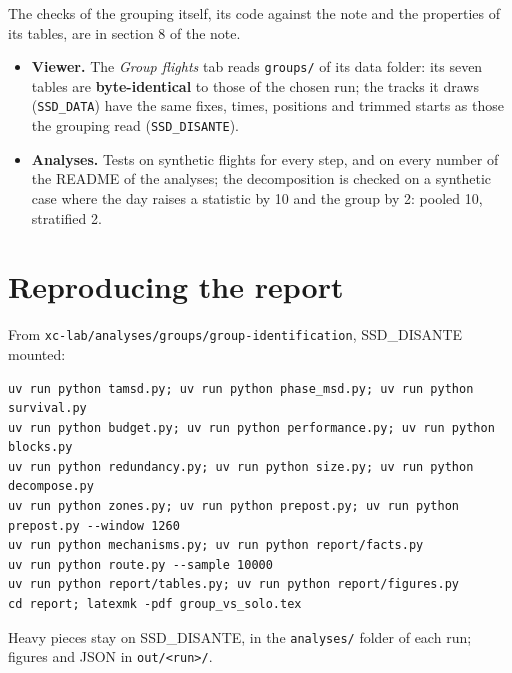 The checks of the grouping itself, its code against the note and the properties of its tables, are in
section 8 of the note.

\begin{itemize}
  \item \textbf{Viewer.} The \emph{Group flights} tab reads \texttt{groups/} of its data folder: its seven tables are \textbf{byte-identical} to those of the chosen run; the tracks it draws (\texttt{SSD\_DATA}) have the same fixes,
        times, positions and trimmed starts as those the grouping read (\texttt{SSD\_DISANTE}).
  \item \textbf{Analyses.} Tests on synthetic flights for every step, and on every number of the README of the analyses; the decomposition is checked on a synthetic case where the day raises
        a statistic by 10 and the group by 2: pooled 10, stratified 2.
\end{itemize}

\section{Reproducing the report}\label{app:reproduce}

From \texttt{xc-lab/analyses/groups/group-identification}, SSD\_DISANTE mounted:
\begin{verbatim}
uv run python tamsd.py; uv run python phase_msd.py; uv run python survival.py
uv run python budget.py; uv run python performance.py; uv run python blocks.py
uv run python redundancy.py; uv run python size.py; uv run python decompose.py
uv run python zones.py; uv run python prepost.py; uv run python prepost.py --window 1260
uv run python mechanisms.py; uv run python report/facts.py
uv run python route.py --sample 10000
uv run python report/tables.py; uv run python report/figures.py
cd report; latexmk -pdf group_vs_solo.tex
\end{verbatim}
Heavy pieces stay on SSD\_DISANTE, in the \texttt{analyses/} folder of each run; figures and JSON in \texttt{out/<run>/}.
